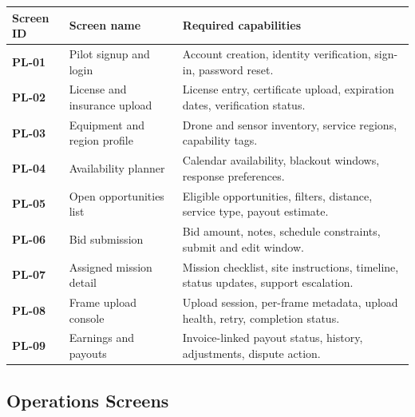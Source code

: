 \documentclass[11pt,a4paper]{article}
\begin{document}
\begin{longtable}{>{\bfseries}p{}p{}p{}}
\toprule
Screen ID & Screen name & Required capabilities \\
\midrule
PL-01 & Pilot signup and login & Account creation, identity verification, sign-in, password reset. \\
PL-02 & License and insurance upload & License entry, certificate upload, expiration dates, verification status. \\
PL-03 & Equipment and region profile & Drone and sensor inventory, service regions, capability tags. \\
PL-04 & Availability planner & Calendar availability, blackout windows, response preferences. \\
PL-05 & Open opportunities list & Eligible opportunities, filters, distance, service type, payout estimate. \\
PL-06 & Bid submission & Bid amount, notes, schedule constraints, submit and edit window. \\
PL-07 & Assigned mission detail & Mission checklist, site instructions, timeline, status updates, support escalation. \\
PL-08 & Frame upload console & Upload session, per-frame metadata, upload health, retry, completion status. \\
PL-09 & Earnings and payouts & Invoice-linked payout status, history, adjustments, dispute action. \\
\bottomrule
\end{longtable}

\subsection{Operations Screens}
\end{document}
